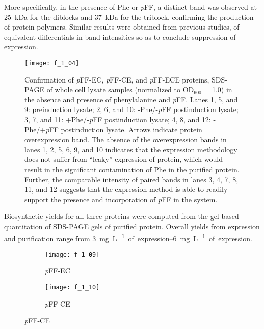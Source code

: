 \begin{refsection}
More specifically, in the presence of Phe or \emph{p}FF, a distinct band was
observed at \SI{25}{\kilo\dalton} for the diblocks and \SI{37}{\kilo\dalton} for
the triblock, confirming the production of protein polymers. Similar results
were obtained from previous studies, of equivalent differentials in band
intensities so as to conclude suppression of expression.
\begin{figure}[h!] \centering \texttt{[image: f\_1\_04]}
    \caption[Confirmation of \emph{p}FF-EC, \emph{p}FF-CE, and \emph{p}FF-ECE
    proteins, SDS-PAGE of whole cell lysate samples] {Confirmation of
        \emph{p}FF-EC, \emph{p}FF-CE, and \emph{p}FF-ECE proteins, SDS-PAGE of
        whole cell lysate samples (normalized to OD{$_{600}$} = 1.0) in the
        absence and presence of phenylalanine and \emph{p}FF. Lanes 1, 5, and 9:
        preinduction lysate; 2, 6, and 10: -Phe/-\emph{p}FF postinduction
        lysate; 3, 7, and 11: +Phe/-\emph{p}FF postinduction lysate; 4, 8, and
        12: -Phe/+\emph{p}FF postinduction lysate. Arrows indicate protein
        overexpression band. The absence of the overexpression bands in lanes 1,
        2, 5, 6, 9, and 10 indicates that the expression methodology does not
        suffer from ``leaky'' expression of protein, which would result in the
        significant contamination of Phe in the purified protein. Further, the
        comparable intensity of paired bands in lanes 3, 4, 7, 8, 11, and 12
        suggests that the expression method is able to readily support the
        presence and incorporation of \emph{p}FF in the system.}
        \label{fig:expression_gel_pFF} \end{figure}
Biosynthetic yields for all three proteins were computed from the gel-based
quantitation of SDS-PAGE gels of purified protein. Overall yields from
expression and purification range from \SIrange{3}{6}{\mg \per \L of
expression}.
\begin{figure}[h!]
    \centering
    \begin{subfigure}[b]{0.3\textwidth}
        \texttt{[image: f\_1\_09]}
        \caption{\emph{p}FF-EC}
        \label{fig:A}
    \end{subfigure}
    \begin{subfigure}[b]{0.3\textwidth}
        \texttt{[image: f\_1\_10]}
        \caption{\emph{p}FF-CE}
        \label{fig:B}
    \end{subfigure}

\end{figure}
\end{refsection}
